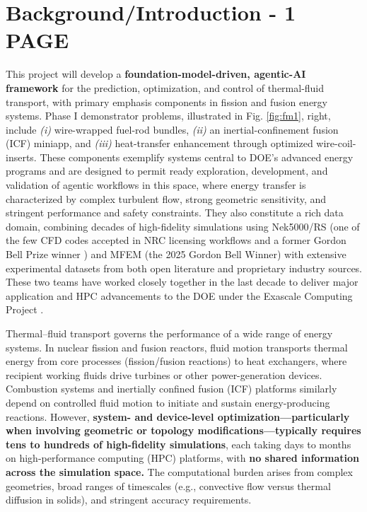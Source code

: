 \section{Background/Introduction  -   1 PAGE}

This project will develop a {\bf foundation-model-driven, agentic-AI framework}
\cite{Vinuesa2026XAI} for the prediction, optimization, and control of
thermal-fluid transport, with primary emphasis components in fission and fusion
energy systems.
  Phase I demonstrator problems, illustrated in Fig.  \ref{fig:fm1}, right, 
include 
{\em (i)} wire-wrapped fuel-rod bundles, 
{\em (ii)} an inertial-confinement fusion (ICF) miniapp, and 
{\em (iii)} heat-transfer enhancement through optimized wire-coil-inserts.
  These components exemplify systems central to DOE’s advanced energy
programs and are designed to permit ready exploration, development, and
validation of agentic workflows in this space, where
    energy transfer is characterized by complex turbulent flow, strong
geometric sensitivity, and stringent performance and safety constraints.
  They also constitute a rich data domain, combining decades of high-fidelity
simulations using Nek5000/RS (one of the few CFD codes accepted in NRC
licensing workflows and a former Gordon Bell Prize winner
\cite{tufo99a,gb23}) and MFEM (the 2025 Gordon Bell Winner) with extensive
experimental datasets from both open literature and proprietary industry sources.
  These two teams have worked closely together in the last decade to deliver
major application and HPC advancements to the DOE under the Exascale Computing
Project \cite{ceed}.





Thermal–fluid transport governs the performance of a wide range of energy systems.
In nuclear fission and fusion reactors, fluid motion transports thermal energy
from core processes (fission/fusion reactions) to heat exchangers, where 
recipient working fluids drive turbines or other power-generation devices.
Combustion systems and inertially confined fusion (ICF) platforms similarly
depend on controlled fluid motion to initiate and sustain energy-producing
reactions.
However, {\bf system- and device-level optimization—particularly when involving
geometric or topology modifications—typically requires tens to hundreds of
high-fidelity simulations}, each taking days to months on high-performance
computing (HPC) platforms,
with {\bf no shared information across the simulation space.} The computational
burden arises from complex geometries, broad ranges of timescales (e.g.,
convective flow versus thermal diffusion in solids), and stringent accuracy
requirements.


